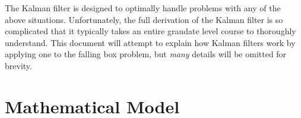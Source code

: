 \documentclass{article}
\begin{document}
The Kalman filter is designed to optimally handle problems with any of the above situations.  Unfortunately, the full derivation of the Kalman filter is so complicated that it typically takes an entire graudate level course to thoroughly understand.  This document will attempt to explain how Kalman filters work by applying one to the falling box problem, but \emph{many} details will be omitted for brevity.  


\section{Mathematical Model}
\label{sec:mathModel}
\end{document}

